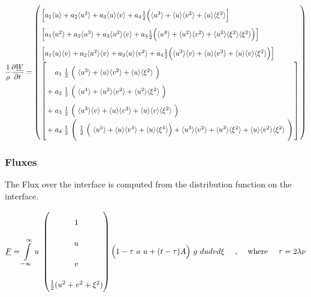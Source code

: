 \documentclass[
	pdftex,             %
	12pt,				%
	a4paper,		   	%
	english,				%
	oneside,			%
]{article}
\newcommand{\mom}[1]{\langle #1 \rangle}
\newcommand{\uu}[1]{\underline{#1}}
\begin{document}
\begin{equation}
\arraycolsep=1.4pt\def\arraystretch{2.2}
\dfrac{1}{\rho}\dfrac{\partial \uu{W}}{\partial t} = 
\left(
\begin{array}{l}
    \left[
        a_1 \mom{u} + a_2 \mom{u^2} + a_3 \mom{u}\mom{v}
    +   a_4 \frac{1}{2} \Big( \mom{u^3} + \mom{u}\mom{v^2} + \mom{u}\mom{\xi^2}
    \right] \\
    \left[
        a_1 \mom{u^2} + a_2 \mom{u^3} + a_3 \mom{u^2}\mom{v}
    +   a_4 \frac{1}{2} \Big( \mom{u^4} + \mom{u^2}\mom{v^2} + \mom{u^2}\mom{\xi^2}\mom{\xi^2} \Big)
    \right] \\
    \left[
        a_1 \mom{u}\mom{v} + a_2 \mom{u^2}\mom{v} + a_3 \mom{u}\mom{v^2}
    +   a_4 \frac{1}{2} \Big( \mom{u^3}\mom{v} + \mom{u}\mom{v^3} + \mom{u}\mom{v}\mom{\xi^2} \Big)
    \right] \\
    \left[
        \begin{array}{lcl}
             &a_1& \frac{1}{2}~ \Big(~ \mom{u^3} + \mom{u}\mom{v^2} + \mom{u}\mom{\xi^2} ~\Big) \\
            +&a_2& \frac{1}{2}~ \Big(~ \mom{u^4} + \mom{u^2}\mom{v^2} + \mom{u^2}\mom{\xi^2} ~\Big) \\
            +&a_3& \frac{1}{2}~ \Big(~ \mom{u^3}\mom{v} + \mom{u}\mom{v^3} + \mom{u}\mom{v}\mom{\xi^2} ~\Big) \\
            +&a_4& \frac{1}{2}~ \Bigg(~ \frac{1}{2}~
					\Big(~ \mom{u^5} + \mom{u}\mom{v^4} + \mom{u}\mom{\xi^4} \Big)
						 + \mom{u^3}\mom{v^2} + \mom{u^3}\mom{\xi^2} + \mom{u}\mom{v^2}\mom{\xi^2}
					~\Bigg)
        \end{array}
    \right]
\end{array}
\right)
\end{equation}

\subsubsection{Fluxes}

The Flux over the interface is computed from the distribution function on the interface. 

\begin{equation}
\uu{F} = 
\int \limits_{-\infty}^{\infty}
u~
\begin{pmatrix}
	1 \\ u \\ v \\ \frac{1}{2} (u^2 + v^2 + \xi^2)
\end{pmatrix}
\Big(
	1 - \tau~a~u + (t-\tau)A
\Big)
~g~ du dv d\xi
\textnormal{~~~~,~~~~where~~~~}
\tau = 2 \lambda \nu
\end{equation}
\end{document}
